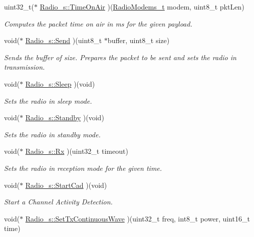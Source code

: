 \begin{DoxyCompactItemize}
uint32\+\_\+t($\ast$ \hyperlink{group__LORA_ga36552db411e04e05c7962912854d48ae}{Radio\+\_\+s\+::\+Time\+On\+Air} )(\hyperlink{group__LORA_ga992ef7a5b7f52975ba7bd8dd97740057}{Radio\+Modems\+\_\+t} modem, uint8\+\_\+t pkt\+Len)
\begin{DoxyCompactList}\small\item\em Computes the packet time on air in ms for the given payload. \end{DoxyCompactList}\item 
void($\ast$ \hyperlink{group__LORA_ga80f05bcd6ec2aea2eec2fc16850c6829}{Radio\+\_\+s\+::\+Send} )(uint8\+\_\+t $\ast$buffer, uint8\+\_\+t size)
\begin{DoxyCompactList}\small\item\em Sends the buffer of size. Prepares the packet to be sent and sets the radio in transmission. \end{DoxyCompactList}\item 
void($\ast$ \hyperlink{group__LORA_ga1ce3ea830b03dffac6f6fec459dc77d3}{Radio\+\_\+s\+::\+Sleep} )(void)
\begin{DoxyCompactList}\small\item\em Sets the radio in sleep mode. \end{DoxyCompactList}\item 
void($\ast$ \hyperlink{group__LORA_ga2972c07018c9c2de5c76c6c0563bea7b}{Radio\+\_\+s\+::\+Standby} )(void)
\begin{DoxyCompactList}\small\item\em Sets the radio in standby mode. \end{DoxyCompactList}\item 
void($\ast$ \hyperlink{group__LORA_ga102f21c524b5c8eb87a2d65f8ac6cbe4}{Radio\+\_\+s\+::\+Rx} )(uint32\+\_\+t timeout)
\begin{DoxyCompactList}\small\item\em Sets the radio in reception mode for the given time. \end{DoxyCompactList}\item 
void($\ast$ \hyperlink{group__LORA_ga8f9e97d8a3010e96e108dc62c1e5b107}{Radio\+\_\+s\+::\+Start\+Cad} )(void)
\begin{DoxyCompactList}\small\item\em Start a Channel Activity Detection. \end{DoxyCompactList}\item 
void($\ast$ \hyperlink{group__LORA_ga6b20fa3f6908c0165b26d8e02b944e3b}{Radio\+\_\+s\+::\+Set\+Tx\+Continuous\+Wave} )(uint32\+\_\+t freq, int8\+\_\+t power, uint16\+\_\+t time)

\end{DoxyCompactItemize}
